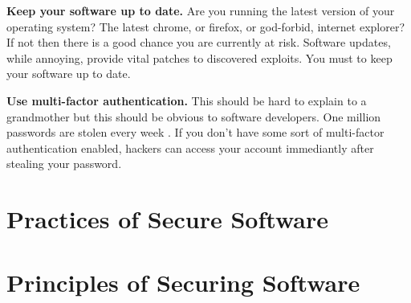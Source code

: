 \documentclass{csse4400}
\begin{document}
\textbf{Keep your software up to date.}
Are you running the latest version of your operating system?
The latest chrome, or firefox, or god-forbid, internet explorer?
If not then there is a good chance you are currently at risk.
Software updates, while annoying, provide vital patches to discovered exploits.
You must to keep your software up to date.

\textbf{Use multi-factor authentication.}
This should be hard to explain to a grandmother but this should be obvious to software developers.
One million passwords are stolen every week \cite{password-security}.
If you don't have some sort of multi-factor authentication enabled, hackers can access your account immediantly after stealing your password.


\section{Practices of Secure Software}


\section{Principles of Securing Software}
\end{document}
